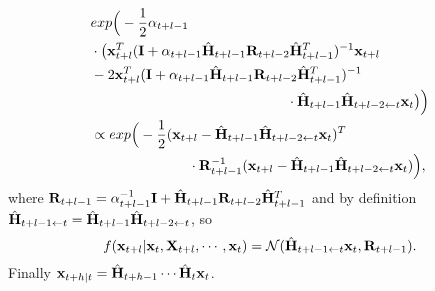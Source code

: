 \documentclass[journal]{IEEEtran}
\begin{document}
\begin{equation}
\begin{aligned}
&exp\Big(-\frac{1}{2}\alpha_{t+l-1}\\&\cdot\big({\bf{x}}_{t+l}^T({\bf{I}}+\alpha_{t+l-1}\hat {\bf{H}}_{t+l-1}{\bf{R}}_{t+l-2}\hat {\bf{H}}_{t+l-1}^T)^{-1}{\bf{x}}_{t+l}
\\&-2{\bf{x}}_{t+l}^T({\bf{I}}+\alpha_{t+l-1}\hat {\bf{H}}_{t+l-1}{\bf{R}}_{t+l-2}\hat {\bf{H}}_{t+l-1}^T)^{-1}
\\&\qquad\qquad\qquad\qquad\qquad\qquad\qquad\cdot\hat {\bf{H}}_{t+l-1}\hat {\bf{H}}_{t+l-2\leftarrow t}{\bf{x}}_t\big)\Big)
\\&\propto exp\Big(-\frac{1}{2}({\bf{x}}_{t+l}-\hat {\bf{H}}_{t+l-1}\hat {\bf{H}}_{t+l-2\leftarrow t}{\bf{x}}_t)^T
\\&\quad\qquad\qquad\qquad\cdot {\bf{R}}_{t+l-1}^{-1}({\bf{x}}_{t+l}-\hat {\bf{H}}_{t+l-1}\hat {\bf{H}}_{t+l-2\leftarrow t}{\bf{x}}_t)\Big),
\end{aligned}
\end{equation}
where ${\bf{R}}_{t+l-1}=\alpha_{t+l-1}^{-1}{\bf{I}}+\hat {\bf{H}}_{t+l-1}{\bf{R}}_{t+l-2}\hat {\bf{H}}_{t+l-1}^T$
and by definition $\hat {\bf{H}}_{t+l-1\leftarrow t}=\hat {\bf{H}}_{t+l-1}\hat {\bf{H}}_{t+l-2\leftarrow t}$, so 
\begin{equation}
 f({\bf{x}}_{t+l}|{\bf{x}}_t,{\bf{X}}_{t+l},\cdots,{\bf{x}}_t)=\mathcal{N}(\hat {\bf{H}}_{t+l-1\leftarrow t}{\bf{x}}_t,{\bf{R}}_{t+l-1}).
\end{equation}
Finally ${\bf{x}}_{t+h|t}=\hat {\bf{H}}_{t+h-1}\cdots\hat {\bf{H}}_t{\bf{x}}_t$.










\ifCLASSOPTIONcaptionsoff
  \newpage
\fi
\end{document}
